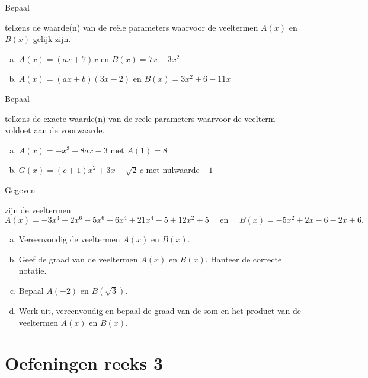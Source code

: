 \documentclass{ximera}
\begin{document}
\begin{exercise} 
\hypertarget{oef1.9}{Bepaal} telkens de waarde(n) van de re\"ele parameters waarvoor de veeltermen $A(x)$ en $B(x)$ gelijk zijn.
\begin{enumerate}[(a)]
\item
$A(x) = (ax+7)x$ en $B(x) = 7x-3x^2$ %
\item
$A(x) = (ax+b)(3x-2)$ en $B(x) = 3x^2+6-11x$ %
\end{enumerate}
\end{exercise} 

\begin{exercise} 
\hypertarget{oef1.10}{Bepaal} telkens de exacte waarde(n) van de re\"ele parameters waarvoor de veelterm voldoet aan de voorwaarde. 
\begin{enumerate}[(a)]
\item
$A(x) = -x^3-8ax-3$  %
met $A(1) = 8$ 
\item
$G(x) = (c+1)x^2+3x-\sqrt{2}\,c$ %
met nulwaarde $-1$
\end{enumerate}
\end{exercise} 

\begin{exercise} 
\hypertarget{oef1.11}{Gegeven} zijn de veeltermen 
\[
A(x) = -3x^4+2x^6-5x^6+6x^4+21x^4-5+12x^2+5 \quad \text{ en } \quad B(x) = -5x^2+2x-6-2x+6.
\]
\begin{enumerate}[(a)]
\item
Vereenvoudig de veeltermen $A(x)$ en $B(x)$.
\item
Geef de graad van de veeltermen $A(x)$ en $B(x)$. Hanteer de correcte notatie.
\item
Bepaal $A(-2)$ en $B(\sqrt{3})$. 
\item
Werk uit, vereenvoudig en bepaal de graad van de som en het product van de veeltermen $A(x)$ en $B(x)$. 
\end{enumerate}
\end{exercise} 
















\section*{Oefeningen reeks 3}
\end{document}
